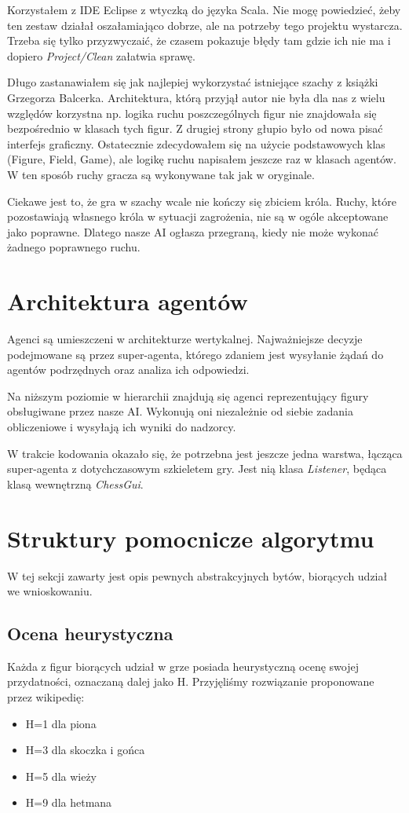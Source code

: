 \documentclass[a4paper,12pt,oneside,notitlepage,onecolumn]{article}
\begin{document}
Korzystałem z IDE Eclipse z wtyczką do języka Scala.
Nie mogę powiedzieć, żeby ten zestaw działał oszałamiająco dobrze, ale na potrzeby tego projektu wystarcza.
Trzeba się tylko przyzwyczaić, że czasem pokazuje błędy tam gdzie ich nie ma i dopiero \emph{Project/Clean} załatwia sprawę.

Długo zastanawiałem się jak najlepiej wykorzystać istniejące szachy z książki Grzegorza Balcerka.
Architektura, którą przyjął autor nie była dla nas z wielu względów korzystna np. logika ruchu poszczególnych figur nie znajdowała się bezpośrednio w klasach tych figur.
Z drugiej strony głupio było od nowa pisać interfejs graficzny.
Ostatecznie zdecydowałem się na użycie podstawowych klas (Figure, Field, Game), ale logikę ruchu napisałem jeszcze raz w klasach agentów.
W ten sposób ruchy gracza są wykonywane tak jak w oryginale.

Ciekawe jest to, że gra w szachy wcale nie kończy się zbiciem króla.
Ruchy, które pozostawiają własnego króla w sytuacji zagrożenia, nie są w ogóle akceptowane jako poprawne.
Dlatego nasze AI ogłasza przegraną, kiedy nie może wykonać żadnego poprawnego ruchu.

\section{Architektura agentów}
Agenci są umieszczeni w architekturze wertykalnej.
Najważniejsze decyzje podejmowane są przez super-agenta, którego zdaniem jest wysyłanie żądań do agentów podrzędnych oraz analiza ich odpowiedzi.

Na niższym poziomie w hierarchii znajdują się agenci reprezentujący figury obsługiwane przez nasze AI.
Wykonują oni niezależnie od siebie zadania obliczeniowe i wysyłają ich wyniki do nadzorcy.

W trakcie kodowania okazało się, że potrzebna jest jeszcze jedna warstwa, łącząca super-agenta z dotychczasowym szkieletem gry.
Jest nią klasa \emph{Listener}, będąca klasą wewnętrzną \emph{ChessGui}.

\section{Struktury pomocnicze algorytmu}
W tej sekcji zawarty jest opis pewnych abstrakcyjnych bytów, biorących udział we wnioskowaniu.

\subsection{Ocena heurystyczna}
Każda z figur biorących udział w grze posiada heurystyczną ocenę swojej przydatności, oznaczaną dalej jako H.
Przyjęliśmy rozwiązanie proponowane przez wikipedię:
\begin{itemize}
 \item H=1 dla piona
 \item H=3 dla skoczka i gońca
 \item H=5 dla wieży
 \item H=9 dla hetmana
\end{itemize}
\end{document}
